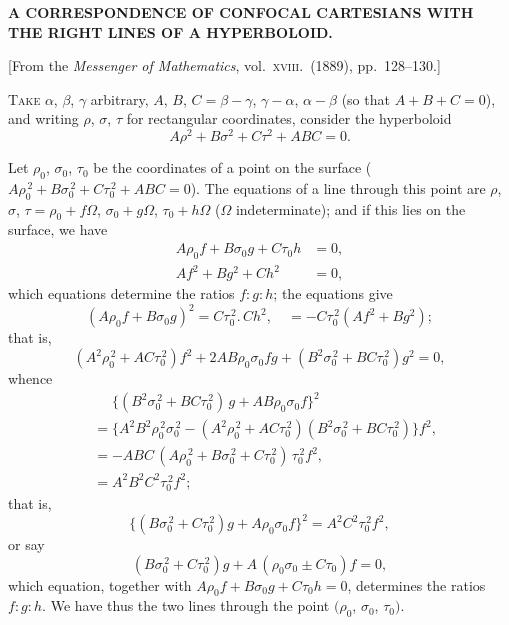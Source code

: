\documentclass[11pt,a4paper]{book}
\begin{document}
\begin{center}
\textbf{A CORRESPONDENCE OF CONFOCAL CARTESIANS WITH THE RIGHT LINES OF A HYPERBOLOID.}
\end{center}

\begin{center}
[From the \textit{Messenger of Mathematics}, vol.\ \textsc{xviii}.\ (1889), pp.\ 128--130.]
\end{center}

\textsc{Take} $\alpha$, $\beta$, $\gamma$ arbitrary, $A$, $B$, $C = \beta-\gamma$, $\gamma-\alpha$, $\alpha-\beta$ (so that $A+B+C=0$), and writing $\rho$, $\sigma$, $\tau$ for rectangular coordinates, consider the hyperboloid
\[ A\rho^2 + B\sigma^2 + C\tau^2 + ABC = 0. \]

Let $\rho_0$, $\sigma_0$, $\tau_0$ be the coordinates of a point on the surface ($A\rho_0^{\,2} + B\sigma_0^{\,2} + C\tau_0^{\,2} + ABC = 0$). The equations of a line through this point are $\rho$, $\sigma$, $\tau = \rho_0 + f\Omega$, $\sigma_0 + g\Omega$, $\tau_0 + h\Omega$ ($\Omega$ indeterminate); and if this lies on the surface, we have
\begin{align*}
A\rho_0 f + B\sigma_0 g + C\tau_0 h &= 0, \\
Af^2 + Bg^2 + Ch^2 &= 0,
\end{align*}
which equations determine the ratios $f : g : h$; the equations give
\[ (A\rho_0 f + B\sigma_0 g)^2 = C\tau_0^{\,2} .\, Ch^2, \quad = -C\tau_0^{\,2}(Af^2 + Bg^2); \]
that is,
\[ (A^2\rho_0^{\,2} + AC\tau_0^{\,2})f^2 + 2AB\rho_0\sigma_0 fg + (B^2\sigma_0^{\,2} + BC\tau_0^{\,2})g^2 = 0, \]
whence
\begin{align*}
&\phantom{=} \{(B^2\sigma_0^{\,2} + BC\tau_0^{\,2})\, g + AB\rho_0\sigma_0 f \}^2 \\
&= \{A^2B^2\rho_0^{\,2}\sigma_0^{\,2} - (A^2\rho_0^{\,2} + AC\tau_0^{\,2})(B^2\sigma_0^{\,2} + BC\tau_0^{\,2})\} f^2, \\
&= -ABC\,(A\rho_0^{\,2} + B\sigma_0^{\,2} + C\tau_0^{\,2})\, \tau_0^{\,2} f^2, \\
&= A^2B^2C^2 \tau_0^{\,2} f^2;
\end{align*}
that is,
\[ \{(B\sigma_0^{\,2} + C\tau_0^{\,2})g + A\rho_0\sigma_0 f\}^2 = A^2C^2\tau_0^{\,2} f^2, \]
or say
\[ (B\sigma_0^{\,2} + C\tau_0^{\,2})g + A\,(\rho_0\sigma_0 \pm C\tau_0)f = 0, \]
which equation, together with $A\rho_0 f + B\sigma_0 g + C\tau_0 h = 0$, determines the ratios $f : g : h$. We have thus the two lines through the point $(\rho_0$, $\sigma_0$, $\tau_0)$.
\end{document}
